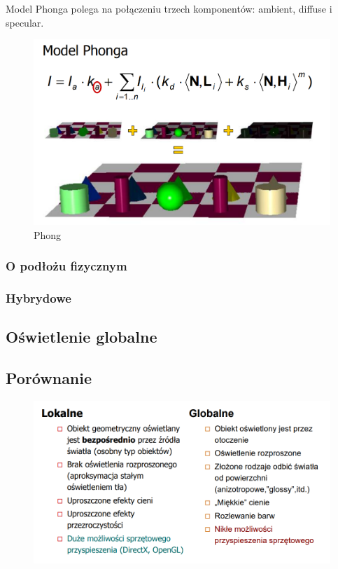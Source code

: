 \documentclass[12pt]{article}
\begin{document}
Model Phonga polega na połączeniu trzech komponentów: ambient, diffuse i specular.
\begin{figure}[H]
	\centering
	\includegraphics[scale=0.5]{Pictures/phong.png}
	\caption{Phong}
\end{figure}

\subsubsection{O podłożu fizycznym}

\subsubsection{Hybrydowe}

\subsection{Oświetlenie globalne}

\subsection{Porównanie}
\begin{figure}[H]
	\centering
	\includegraphics[scale=0.5]{Pictures/oswietlenie.png}
	\caption{}
\end{figure}
\end{document}
